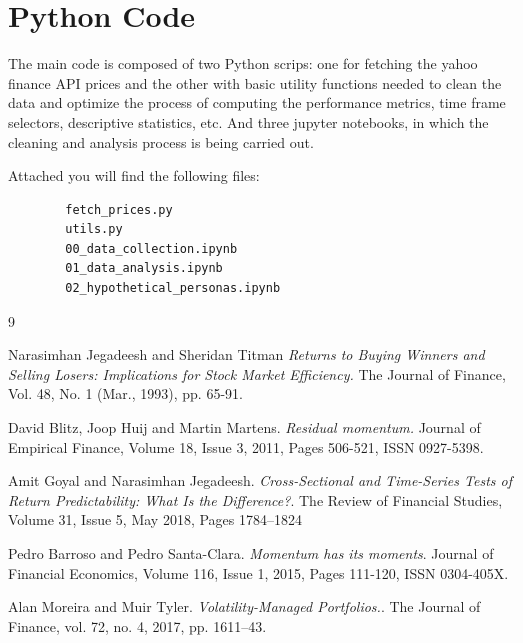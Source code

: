 \documentclass[12pt, a4paper]{article}
\begin{document}
	\section{Python Code}
	\label{app:code}
	
	The main code is composed of two Python scrips: one for fetching the yahoo finance API prices and the other with basic utility functions needed to clean the data and optimize the process of computing the performance metrics, time frame selectors, descriptive statistics, etc. And three jupyter notebooks, in which the cleaning and analysis process is being carried out. 
	
	Attached you will find the following files:	
	\begin{verbatim}
		fetch_prices.py
		utils.py
		00_data_collection.ipynb
		01_data_analysis.ipynb
		02_hypothetical_personas.ipynb
	\end{verbatim}
	

\begin{thebibliography}{9}
	
	Narasimhan Jegadeesh and Sheridan Titman \textit{Returns to Buying Winners and Selling Losers: Implications for Stock Market Efficiency.}  The Journal of Finance, Vol. 48, No. 1 (Mar., 1993), pp. 65-91.
	
	David Blitz, Joop Huij and Martin Martens. \textit{Residual momentum.} Journal of Empirical Finance, Volume 18, Issue 3, 2011, Pages 506-521, ISSN 0927-5398.
	
	Amit Goyal and Narasimhan Jegadeesh. \textit{Cross-Sectional and Time-Series Tests of Return Predictability: What Is the Difference?}. The Review of Financial Studies, Volume 31, Issue 5, May 2018, Pages 1784–1824
	
	Pedro Barroso and Pedro Santa-Clara. \textit{Momentum has its moments}. 	Journal of Financial Economics, Volume 116, Issue 1, 2015, Pages 111-120, ISSN 0304-405X.
	
	Alan Moreira and Muir Tyler. \textit{Volatility-Managed Portfolios.}. The Journal of Finance, vol. 72, no. 4, 2017, pp. 1611–43.
	
\end{thebibliography}
	
\end{document}
